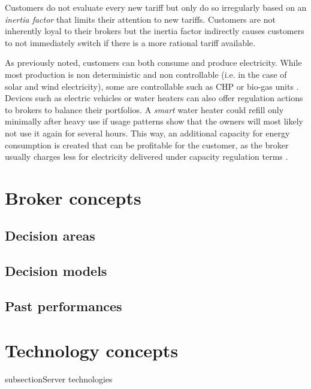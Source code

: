 Customers do not evaluate every new tariff but only do so irregularly based on an \emph{inertia factor} that limits their attention to new tariffs. Customers are not inherently loyal to their brokers but the inertia factor indirectly causes customers to not immediately switch if there is a more rational tariff available. 

As previously noted, customers can both consume and produce electricity. While most production is non deterministic and non controllable (i.e. in the case of solar and wind electricity), some are controllable such as \ac{CHP} or bio-gas units \citep[p.16]{ketter2018powertac}. Devices such as electric vehicles or water heaters can also offer regulation actions to brokers to balance their portfolios. A \emph{smart} water heater could refill only minimally after heavy use if usage patterns show that the owners will most likely not use it again for several hours. This way, an additional capacity for energy consumption is created that can be profitable for the customer, as the broker usually charges less for electricity delivered under capacity regulation terms \citep[p.14ff.]{ketter2018powertac}.

\section{Broker concepts}
\subsection{Decision areas}
\subsection{Decision models}
\subsection{Past performances}

\section{Technology concepts}
subsection{Server technologies}



